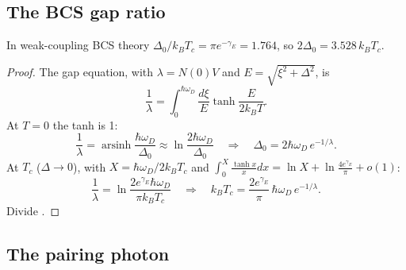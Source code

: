 \subsection{The BCS gap ratio}
\begin{statement}In weak-coupling BCS theory $\Delta_0/k_BT_c=\pi e^{-\gamma_E}=1.764$, so $2\Delta_0=3.528\,k_BT_c$.\end{statement}
\begin{proof}
The gap equation, with $\lambda=N(0)V$ and $E=\sqrt{\xi^2+\Delta^2}$, is
\begin{equation}
\frac1\lambda=\int_0^{\hbar\omega_D}\frac{d\xi}{E}\tanh\frac{E}{2k_BT}.\label{eq:gap}
\end{equation}
At $T=0$ the tanh is 1:
\[
\frac1\lambda=\operatorname{arsinh}\frac{\hbar\omega_D}{\Delta_0}\approx\ln\frac{2\hbar\omega_D}{\Delta_0}
\quad\Longrightarrow\quad \Delta_0=2\hbar\omega_D\,e^{-1/\lambda}.
\]
At $T_c$ ($\Delta\to0$), with $X=\hbar\omega_D/2k_BT_c$ and $\int_0^X\frac{\tanh x}{x}dx=\ln X+\ln\frac{4e^{\gamma_E}}{\pi}+o(1)$:
\[
\frac1\lambda=\ln\frac{2e^{\gamma_E}\hbar\omega_D}{\pi k_BT_c}
\quad\Longrightarrow\quad k_BT_c=\frac{2e^{\gamma_E}}{\pi}\,\hbar\omega_D\,e^{-1/\lambda}.
\]
Divide \cite{bcs,tinkham}.
\end{proof}

\subsection{The pairing photon}

